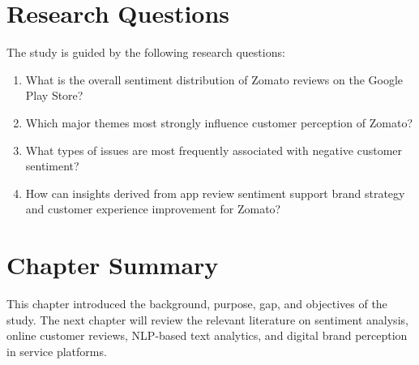 \section{Research Questions}

The study is guided by the following research questions:

\begin{enumerate}[label=\arabic*.]
    \item What is the overall sentiment distribution of Zomato reviews on the Google Play Store?
    \item Which major themes most strongly influence customer perception of Zomato?
    \item What types of issues are most frequently associated with negative customer sentiment?
    \item How can insights derived from app review sentiment support brand strategy and customer experience improvement for Zomato?
\end{enumerate}

\section{Chapter Summary}

This chapter introduced the background, purpose, gap, and objectives of the study. The next chapter will review the relevant literature on sentiment analysis, online customer reviews, NLP-based text analytics, and digital brand perception in service platforms.
